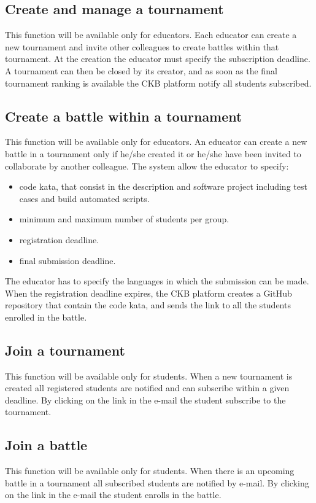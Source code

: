 \subsection{Create and manage a tournament}
This function will be available only for educators. \newline
Each educator can create a new tournament and invite other colleagues to create battles within that tournament. At the creation the educator must specify the subscription deadline. 
A tournament can then be closed by its creator, and as soon as the final tournament ranking is available the CKB platform notify all students subscribed.

\subsection{Create a battle within a tournament}
This function will be available only for educators. \newline 
An educator can create a new battle in a tournament only if he/she created it or he/she have been invited to collaborate by another colleague.
The system allow the educator to specify: 
\begin{itemize}
    \item code kata, that consist in the description and software project including test cases and build automated scripts.
    \item minimum and maximum number of students per group.
    \item registration deadline.
    \item final submission deadline.
\end{itemize}
The educator has to specify the languages in which the submission can be made.
When the registration deadline expires, the CKB platform creates a GitHub repository that contain the code kata, and sends the link to all the students enrolled in the battle.

\subsection{Join a tournament}
This function will be available only for students. \newline When a new tournament is created all registered students are notified and can subscribe within a given deadline.  By clicking on the link in the e-mail the student subscribe to the tournament.

\subsection{Join a battle}
This function will be available only for students. \newline 
When there is an upcoming battle in a tournament all subscribed students are notified by e-mail. By clicking on the link in the e-mail the student enrolls in the battle. 

